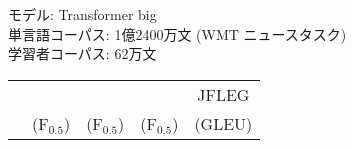 \documentclass[11pt]{beamer}
\begin{document}
\begin{frame}[t]
\begin{columns}[t]
\begin{column}{.33\linewidth}
			\vspace*{-0.5em}
			\begin{figure}[H]
				\centering
			\end{figure}

			\vspace*{-0.8em}
			\begin{tcolorbox}[
					enhanced,
					fonttitle=\bfseries,
				colframe=gray,
				colback=gray!5!,
				colbacktitle=gray!80,
					attach boxed title to top left={yshift=-2mm, xshift=2mm},
				]
				モデル: Transformer big \\
				単言語コーパス: 1億2400万文 {\scriptsize (WMT ニュースタスク)} \\
				学習者コーパス: 62万文
				\begin{table}[H]
					\centering
					\small
					\tabcolsep 6pt
					\label{tab:result}
					\begin{tabular}{lcccc}
						\hline
						& \multicolumn{2}{c}{\footnotesize
								\hspace{-0em}{$\def\arraystretch{0.5}\begin{array}{cc}\vspace{-0.5em}\\\multicolumn{2}{c}{\text{BEA-19}}\\\text{valid} & \text{test}\\\end{array}$}\hspace{-2em}}
						& \hspace{-2em}{\footnotesize $\def\arraystretch{0.5}\begin{array}{c}\vspace{-0.5em}\\\text{CoNLL}\\\text{14}\\\end{array}$}\hspace{-2em}
						& {\footnotesize JFLEG}
						\\
						& {\scriptsize (F${}_{0.5}$)}
						& {\scriptsize (F${}_{0.5}$)}
						& {\scriptsize (F${}_{0.5}$)}
						& {\scriptsize (GLEU)}
						\\

\end{tabular}
\end{table}
\end{tcolorbox}
\end{column}
\end{columns}
\end{frame}
\end{document}
